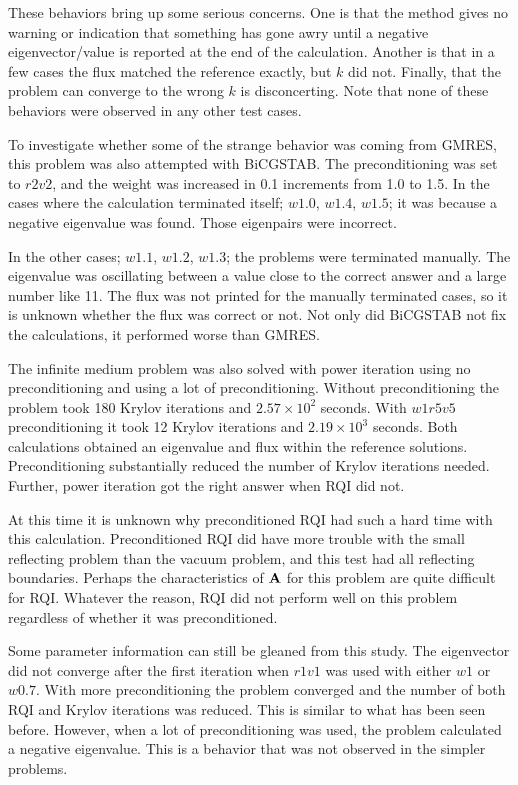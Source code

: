 These behaviors bring up some serious concerns. One is that the method gives no warning or indication that something has gone awry until a negative eigenvector/value is reported at the end of the calculation. Another is that in a few cases the flux matched the reference exactly, but $k$ did not. Finally, that the problem can converge to the wrong $k$ is disconcerting. Note that none of these behaviors were observed in any other test cases.  

To investigate whether some of the strange behavior was coming from GMRES, this problem was also attempted with BiCGSTAB. The preconditioning was set to $r2v2$, and the weight was increased in 0.1 increments from 1.0 to 1.5. In the cases where the calculation terminated itself; $w1.0$, $w1.4$, $w1.5$; it was because a negative eigenvalue was found. Those eigenpairs were incorrect. 

In the other cases; $w1.1$, $w1.2$, $w1.3$; the problems were terminated manually. The eigenvalue was oscillating between a value close to the correct answer and a large number like 11. The flux was not printed for the manually terminated cases, so it is unknown whether the flux was correct or not. Not only did BiCGSTAB not fix the calculations, it performed worse than GMRES.

The infinite medium problem was also solved with power iteration using no preconditioning and using a lot of preconditioning. Without preconditioning the problem took 180 Krylov iterations and $2.57 \times 10^{2}$ seconds. With $w1r5v5$ preconditioning it took 12 Krylov iterations and $2.19 \times 10^{3}$ seconds. Both calculations obtained an eigenvalue and flux within the reference solutions. Preconditioning substantially reduced the number of Krylov iterations needed. Further, power iteration got the right answer when RQI did not. 

At this time it is unknown why preconditioned RQI had such a hard time with this calculation. Preconditioned RQI did have more trouble with the small reflecting problem than the vacuum problem, and this test had all reflecting boundaries. Perhaps the characteristics of $\mathbf{A}$ for this problem are quite difficult for RQI. Whatever the reason, RQI did not perform well on this problem regardless of whether it was preconditioned.  

Some parameter information can still be gleaned from this study. The eigenvector did not converge after the first iteration when $r1v1$ was used with either $w1$ or $w0.7$. With more preconditioning the problem converged and the number of both RQI and Krylov iterations was reduced. This is similar to what has been seen before. However, when a lot of preconditioning was used, the problem calculated a negative eigenvalue. This is a behavior that was not observed in the simpler problems. 

